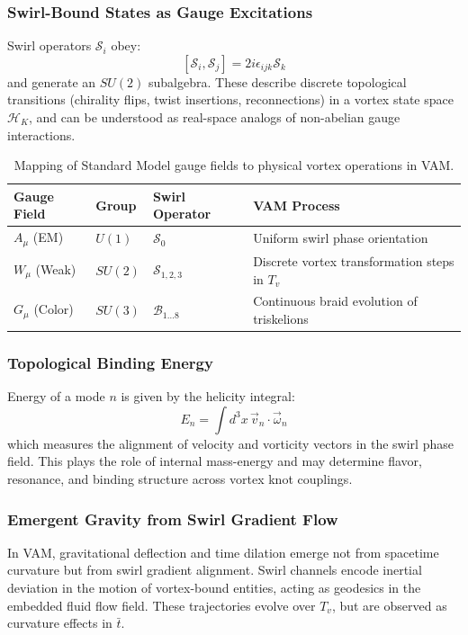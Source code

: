 \documentclass[12pt]{article}
\begin{document}
\subsubsection*{Swirl-Bound States as Gauge Excitations}

Swirl operators \( \mathcal{S}_i \) obey:
\[
[ \mathcal{S}_i, \mathcal{S}_j ] = 2i \epsilon_{ijk} \mathcal{S}_k
\]
and generate an $SU(2)$ subalgebra. These describe discrete topological transitions (chirality flips, twist insertions, reconnections) in a vortex state space \( \mathcal{H}_K \), and can be understood as real-space analogs of non-abelian gauge interactions.

\begin{table}[H]
\centering
\footnotesize
\renewcommand{\arraystretch}{1.4}
\begin{tabular}{|l|l|l|l|}
\hline
\textbf{Gauge Field} & \textbf{Group} & \textbf{Swirl Operator} & \textbf{VAM Process} \\
\hline
$A_\mu$ (EM) & $U(1)$ & $\mathcal{S}_0$ & Uniform swirl phase orientation \\
$W_\mu$ (Weak) & $SU(2)$ & $\mathcal{S}_{1,2,3}$ & Discrete vortex transformation steps in \( T_v \) \\
$G_\mu$ (Color) & $SU(3)$ & $\mathcal{B}_{1\dots8}$ & Continuous braid evolution of triskelions \\
\hline
\end{tabular}
\caption{Mapping of Standard Model gauge fields to physical vortex operations in VAM.}
\end{table}

\subsubsection*{Topological Binding Energy}

Energy of a mode \(n\) is given by the helicity integral:
\[
E_n = \int d^3x \, \vec{v}_n \cdot \vec{\omega}_n
\]
which measures the alignment of velocity and vorticity vectors in the swirl phase field. This plays the role of internal mass-energy and may determine flavor, resonance, and binding structure across vortex knot couplings.

\subsubsection*{Emergent Gravity from Swirl Gradient Flow}

In VAM, gravitational deflection and time dilation emerge not from spacetime curvature but from swirl gradient alignment. Swirl channels encode inertial deviation in the motion of vortex-bound entities, acting as geodesics in the embedded fluid flow field. These trajectories evolve over $T_v$, but are observed as curvature effects in \( \bar{t} \).
\end{document}
